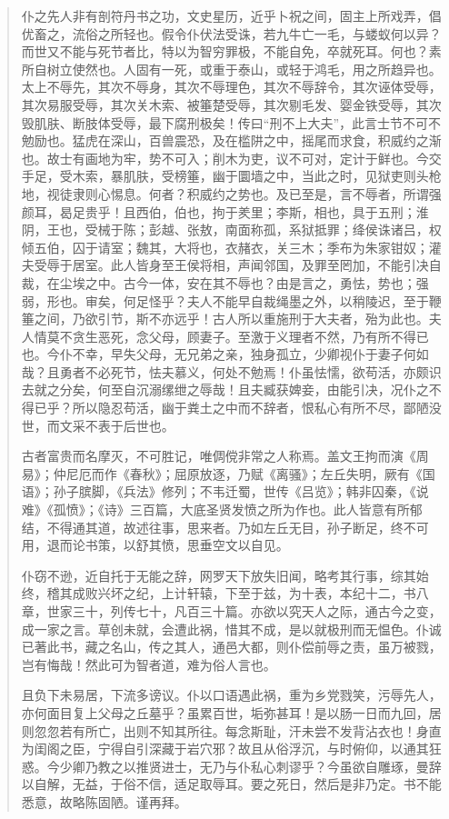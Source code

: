 \documentclass{article}
\begin{document}
\begin{quotation}
仆之先人非有剖符丹书之功，文史星历，近乎卜祝之间，固主上所戏弄，倡优畜之，流俗之所轻也。假令仆伏法受诛，若九牛亡一毛，与蝼蚁何以异？而世又不能与死节者比，特以为智穷罪极，不能自免，卒就死耳。何也？素所自树立使然也。人固有一死，或重于泰山，或轻于鸿毛，用之所趋异也。太上不辱先，其次不辱身，其次不辱理色，其次不辱辞令，其次诬体受辱，其次易服受辱，其次关木索、被箠楚受辱，其次剔毛发、婴金铁受辱，其次毁肌肤、断肢体受辱，最下腐刑极矣！传曰“刑不上大夫”，此言士节不可不勉励也。猛虎在深山，百兽震恐，及在槛阱之中，摇尾而求食，积威约之渐也。故士有画地为牢，势不可入；削木为吏，议不可对，定计于鲜也。今交手足，受木索，暴肌肤，受榜箠，幽于圜墙之中，当此之时，见狱吏则头枪地，视徒隶则心惕息。何者？积威约之势也。及已至是，言不辱者，所谓强颜耳，曷足贵乎！且西伯，伯也，拘于羑里；李斯，相也，具于五刑；淮阴，王也，受械于陈；彭越、张敖，南面称孤，系狱抵罪；绛侯诛诸吕，权倾五伯，囚于请室；魏其，大将也，衣赭衣，关三木；季布为朱家钳奴；灌夫受辱于居室。此人皆身至王侯将相，声闻邻国，及罪至罔加，不能引决自裁，在尘埃之中。古今一体，安在其不辱也？由是言之，勇怯，势也；强弱，形也。审矣，何足怪乎？夫人不能早自裁绳墨之外，以稍陵迟，至于鞭箠之间，乃欲引节，斯不亦远乎！古人所以重施刑于大夫者，殆为此也。夫人情莫不贪生恶死，念父母，顾妻子。至激于义理者不然，乃有所不得已也。今仆不幸，早失父母，无兄弟之亲，独身孤立，少卿视仆于妻子何如哉？且勇者不必死节，怯夫慕义，何处不勉焉！仆虽怯懦，欲苟活，亦颇识去就之分矣，何至自沉溺缧绁之辱哉！且夫臧获婢妾，由能引决，况仆之不得已乎？所以隐忍苟活，幽于粪土之中而不辞者，恨私心有所不尽，鄙陋没世，而文采不表于后世也。

古者富贵而名摩灭，不可胜记，唯倜傥非常之人称焉。盖文王拘而演《周易》；仲尼厄而作《春秋》；屈原放逐，乃赋《离骚》；左丘失明，厥有《国语》；孙子膑脚，《兵法》修列；不韦迁蜀，世传《吕览》；韩非囚秦，《说难》《孤愤》；《诗》三百篇，大底圣贤发愤之所为作也。此人皆意有所郁结，不得通其道，故述往事，思来者。乃如左丘无目，孙子断足，终不可用，退而论书策，以舒其愤，思垂空文以自见。

仆窃不逊，近自托于无能之辞，网罗天下放失旧闻，略考其行事，综其始终，稽其成败兴坏之纪，上计轩辕，下至于兹，为十表，本纪十二，书八章，世家三十，列传七十，凡百三十篇。亦欲以究天人之际，通古今之变，成一家之言。草创未就，会遭此祸，惜其不成，是以就极刑而无愠色。仆诚已著此书，藏之名山，传之其人，通邑大都，则仆偿前辱之责，虽万被戮，岂有悔哉！然此可为智者道，难为俗人言也。

且负下未易居，下流多谤议。仆以口语遇此祸，重为乡党戮笑，污辱先人，亦何面目复上父母之丘墓乎？虽累百世，垢弥甚耳！是以肠一日而九回，居则忽忽若有所亡，出则不知其所往。每念斯耻，汗未尝不发背沾衣也！身直为闺阁之臣，宁得自引深藏于岩穴邪？故且从俗浮沉，与时俯仰，以通其狂惑。今少卿乃教之以推贤进士，无乃与仆私心刺谬乎？今虽欲自雕琢，曼辞以自解，无益，于俗不信，适足取辱耳。要之死日，然后是非乃定。书不能悉意，故略陈固陋。谨再拜。
\end{quotation}
\end{document}
